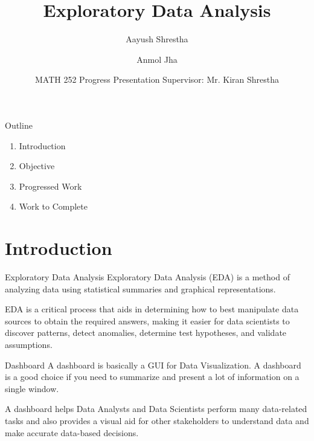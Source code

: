 \documentclass{beamer}
\title{Exploratory Data Analysis}
\date{\small MATH 252 Progress Presentation \newline Supervisor: Mr. Kiran Shrestha}
\institute{Kathmandu University \\ Department of Computational Mathematics}
\author{Aayush Shrestha \and Anmol Jha}
\begin{document}
	\justifying
	\begin{frame}
		\titlepage
	\end{frame}
	
	\begin{frame}{Outline}
		\begin{enumerate}
			\item Introduction
			\item Objective
			\item Progressed Work
			\item Work to Complete
		\end{enumerate}
	\end{frame}
	
	\section{Introduction}
	\begin{frame}{Exploratory Data Analysis}
		Exploratory Data Analysis (EDA) is a method of analyzing data using statistical summaries and graphical representations.\newline \newline
		
		EDA is a critical process that aids in determining how to best manipulate data sources to obtain the required answers, making it easier for data scientists to discover patterns, detect anomalies, determine test hypotheses, and validate assumptions.
	\end{frame}
	
	\begin{frame}{Dashboard}
		A dashboard is basically a GUI for Data Visualization. A dashboard is a good choice if you need to summarize and present a lot of information on a single window.\newline \newline
		
		A dashboard helps Data Analysts and Data Scientists perform many data-related tasks and also provides a visual aid for other stakeholders to understand data and make accurate data-based decisions.
	\end{frame}
	
\end{document}
